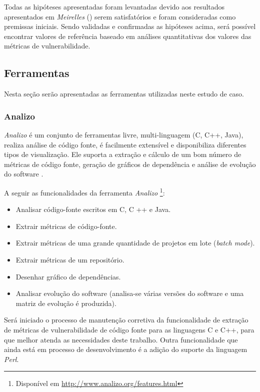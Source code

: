 Todas as hipóteses apresentadas foram levantadas devido aos resultados apresentados em
\emph{Meirelles} (\citeyear{meirelles2013}) serem satisfatórios e foram
consideradas como premissas iniciais. Sendo validadas e confirmadas as hipóteses
acima, será possível encontrar valores de referência baseado em análises
quantitativas dos valores das métricas de vulnerabilidade. 

\subsection{Ferramentas} \label{subsec:ferramentas}

Nesta seção serão apresentadas as ferramentas utilizadas neste estudo de caso.

\subsubsection{Analizo} \label{analizo}

\emph{Analizo} é um conjunto de ferramentas livre, multi-linguagem (C, C++, Java), realiza análise de código fonte, é facilmente 
extensível e disponibiliza diferentes tipos de visualização. Ele suporta a extração e cálculo de um bom número de métricas de 
código fonte, geração de gráficos de dependência e análise de evolução do software \cite{analizo}.

A seguir as funcionalidades da ferramenta \emph{Analizo} \footnote{Disponível em
\url{http://www.analizo.org/features.html}}:

\begin{itemize}
  \item Analisar código-fonte escritos em C, C ++ e Java.
  \item Extrair métricas de código-fonte.
  \item Extrair métricas de uma grande quantidade de projetos em lote (\textit{batch mode}).
  \item Extrair métricas de um repositório.
  \item Desenhar gráfico de dependências.
  \item Analisar evolução do software (analisa-se várias versões do software e uma matriz de evolução é produzida).
\end{itemize}

Será iniciado o processo de manutenção corretiva da funcionalidade de extração de métricas de vulnerabilidade de código fonte 
para as linguagens C e C++, para que melhor atenda as necessidades deste trabalho. Outra funcionalidade que ainda está em 
processo de desenvolvimento é a adição do suporte da linguagem \textit{Perl}.

